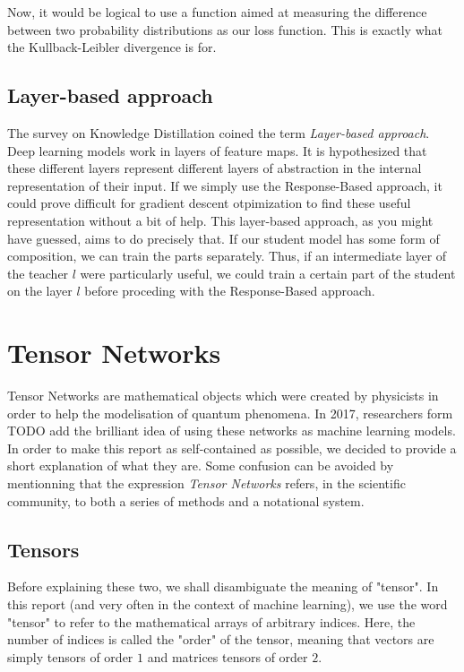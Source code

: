 \documentclass{article}
\theoremstyle{definition}
\theoremstyle{definition}
\begin{document}
Now, it would be logical to use a function aimed at measuring the difference between two probability distributions as our loss function. This is exactly what the Kullback-Leibler divergence is for.

\subsection{Layer-based approach}
The survey on Knowledge Distillation coined the term {\it Layer-based approach}.
Deep learning models work in layers of feature maps. It is hypothesized that
these different layers represent different layers of abstraction in the internal
representation of their input. If we simply use the Response-Based approach, it could prove difficult for gradient descent otpimization to find these useful representation without a bit of help. This layer-based approach, as you might have guessed, aims to do precisely that. If our student model has some form of composition, we can train the parts separately. Thus, if an intermediate layer of the teacher $l$ were particularly useful, we could train a certain part of the student on the layer $l$ before proceding with the Response-Based approach.



\section{Tensor Networks}
Tensor Networks are mathematical objects which were created by physicists in order to help the modelisation of quantum phenomena.
In 2017, researchers form TODO add the brilliant idea of using these networks as machine learning models.
In order to make this report as self-contained as possible, we decided to provide a short explanation of what they are.
Some confusion can be avoided by mentionning that the expression \emph{Tensor Networks} refers, in the scientific community, to both a series of methods and a notational system.

\subsection{Tensors}
Before explaining these two, we shall disambiguate the meaning of "tensor". 
In this report (and very often in the context of machine learning), we use the word "tensor" to refer to the mathematical arrays of arbitrary indices. 
Here, the number of indices is called the "order" of the tensor, meaning that vectors are simply tensors of order $1$ and matrices tensors of order $2$. 
\end{document}
